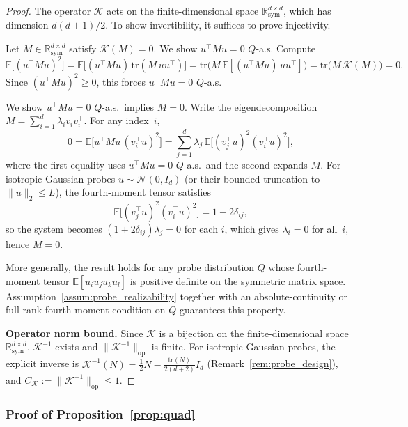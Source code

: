 \documentclass{article}
\newcommand{\R}{\mathbb{R}}
\newcommand{\E}{\mathbb{E}}
\newcommand{\op}{\mathrm{op}}
\newcommand{\tr}{\mathrm{tr}}
\begin{document}
\begin{proof}
The operator $\mathcal K$ acts on the finite-dimensional space $\R^{d\times d}_{\mathrm{sym}}$, which has dimension $d(d+1)/2$.  To show invertibility, it suffices to prove injectivity.

Let $M\in\R^{d\times d}_{\mathrm{sym}}$ satisfy $\mathcal K(M)=0$.  We show $u^\top M u = 0$ $Q$-a.s.  Compute
\[
\E\bigl[(u^\top M u)^2\bigr]
= \E\bigl[(u^\top M u)\,\tr(M\,uu^\top)\bigr]
= \tr\!\bigl(M\,\E[(u^\top M u)\,uu^\top]\bigr)
= \tr\bigl(M\,\mathcal K(M)\bigr)
= 0.
\]
Since $(u^\top M u)^2 \ge 0$, this forces $u^\top M u = 0$ $Q$-a.s.

We show $u^\top M u = 0$ $Q$-a.s.\ implies $M = 0$.  Write the eigendecomposition $M = \sum_{i=1}^d \lambda_i v_i v_i^\top$.  For any index~$i$,
\[
0 = \E\bigl[u^\top M u\,(v_i^\top u)^2\bigr]
= \sum_{j=1}^d \lambda_j\,\E\bigl[(v_j^\top u)^2(v_i^\top u)^2\bigr],
\]
where the first equality uses $u^\top M u = 0$ $Q$-a.s.\ and the second expands $M$.
For isotropic Gaussian probes $u \sim \mathcal N(0,I_d)$ (or their bounded truncation to $\|u\|_2 \le L$), the fourth-moment tensor satisfies
\[
\E\bigl[(v_j^\top u)^2(v_i^\top u)^2\bigr] = 1 + 2\delta_{ij},
\]
so the system becomes $(1+2\delta_{ij})\lambda_j = 0$ for each $i$, which gives $\lambda_i = 0$ for all~$i$, hence $M = 0$.

More generally, the result holds for any probe distribution $Q$ whose fourth-moment tensor $\E[u_i u_j u_k u_l]$ is positive definite on the symmetric matrix space.  Assumption~\ref{assum:probe_realizability} together with an absolute-continuity or full-rank fourth-moment condition on $Q$ guarantees this property.

\textbf{Operator norm bound.}
Since $\mathcal K$ is a bijection on the finite-dimensional space $\R^{d\times d}_{\mathrm{sym}}$, $\mathcal K^{-1}$ exists and $\|\mathcal K^{-1}\|_{\op}$ is finite.  For isotropic Gaussian probes, the explicit inverse is $\mathcal K^{-1}(N) = \frac{1}{2}N - \frac{\tr(N)}{2(d+2)}I_d$ (Remark~\ref{rem:probe_design}), and $C_{\mathcal K} := \|\mathcal K^{-1}\|_{\op} \le 1$.
\end{proof}

\subsubsection{Proof of Proposition~\ref{prop:quad}}
\label{proof:quad}
\end{document}
